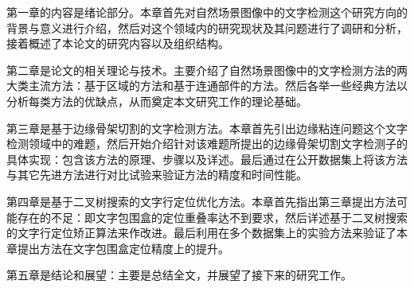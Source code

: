     第一章的内容是绪论部分。本章首先对自然场景图像中的文字检测这个研究方向的背景与意义进行介绍，然后对这个领域内的研究现状及其问题进行了调研和分析，接着概述了本论文的研究内容以及组织结构。
    
    第二章是论文的相关理论与技术。主要介绍了自然场景图像中的文字检测方法的两大类主流方法：基于区域的方法和基于连通部件的方法。然后各举一些经典方法以分析每类方法的优缺点，从而奠定本文研究工作的理论基础。
    
    第三章是基于边缘骨架切割的文字检测方法。本章首先引出边缘粘连问题这个文字检测领域中的难题，然后开始介绍针对该难题所提出的边缘骨架切割文字检测子的具体实现：包含该方法的原理、步骤以及详述。最后通过在公开数据集上将该方法与其它先进方法进行对比试验来验证方法的精度和时间性能。
    
    第四章是基于二叉树搜索的文字行定位优化方法。本章首先指出第三章提出方法可能存在的不足：即文字包围盒的定位重叠率达不到要求，然后详述基于二叉树搜索的文字行定位矫正算法来作改进。最后利用在多个数据集上的实验方法来验证了本章提出方法在文字包围盒定位精度上的提升。
    
    第五章是结论和展望：主要是总结全文，并展望了接下来的研究工作。
    
    
